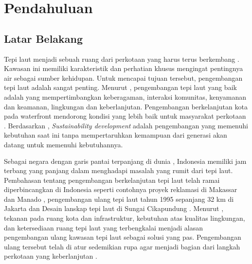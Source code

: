 \documentclass[../projects/thesis.tex]{subfiles}
\begin{document}
\chapter{Pendahuluan}\label{chap:pendahuluan}

\section{Latar Belakang}
Tepi laut menjadi sebuah ruang dari perkotaan yang harus terus berkembang \cite{shamsuddin2013}. Kawasan ini memiliki karakteristik dan perhatian khusus mengingat pentingnya air sebagai sumber kehidupan. Untuk mencapai tujuan tersebut, pengembangan tepi laut adalah sangat penting. Menurut \cite{hussein2014}, pengembangan tepi laut yang baik adalah yang mempertimbangkan keberagaman, interaksi komunitas, kenyamanan dan keamanan, lingkungan dan keberlanjutan. Pengembangan berkelanjutan kota pada waterfront mendorong kondisi yang lebih baik untuk masyarakat perkotaan \citep{brebbia2016sustainable}.
Berdasarkan \cite{imperatives1987}, \textit{Sustainability development} adalah pengembangan yang memenuhi kebutuhan saat ini tanpa mempertaruhkan kemampuan dari generasi akan datang untuk memenuhi kebutuhannya.

Sebagai negara dengan garis pantai terpanjang di dunia \citep{hindersah2015}, Indonesia memiliki jam terbang yang panjang dalam menghadapi masalah yang rumit dari tepi laut. Pembahasan tentang pengembangan berkelanjutan tepi laut telah ramai diperbincangkan di Indonesia seperti contohnya proyek reklamasi di Makassar dan Manado \citep{andi2017,tungka2012, fhuh2017}, pengembangan ulang tepi laut tahun 1995 sepanjang 32 km di Jakarta \citep{pramesti2017} dan Desain lanskap tepi laut di Sungai Cikapundung \citep{ainy2016}. Menurut \cite{breen1993}, tekanan pada ruang kota dan infrastruktur, kebutuhan atas kualitas lingkungan, dan ketersediaan ruang tepi laut yang terbengkalai menjadi alasan pengembangan ulang kawasan tepi laut sebagai solusi yang pas. Pengembangan ulang tersebut telah di atur sedemikian rupa agar menjadi bagian dari langkah perkotaan yang keberlanjutan \citep{pramesti2017}.
\end{document}
